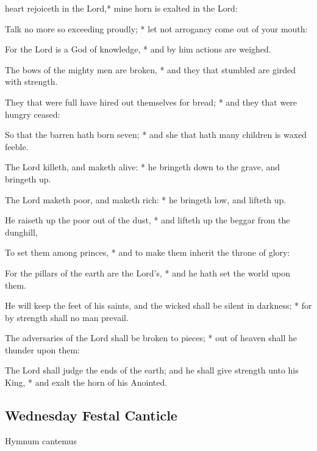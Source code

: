 \begin{multicols}{2}
 heart rejoiceth in the Lord,* mine horn is exalted in the Lord:\par
{}
Talk no more so exceeding proudly; * let not arrogancy come out of your mouth:\par
For the Lord is a God of knowledge, * and by him actions are weighed.\par
The bows of the mighty men are broken, * and they that stumbled are girded with strength.\par
They that were full have hired out themselves for bread; * and they that were hungry ceased:\par
So that the barren hath born seven; * and she that hath many children is waxed feeble.\par
The Lord killeth, and maketh alive: * he bringeth down to the grave, and bringeth up.\par
The Lord maketh poor, and maketh rich: * he bringeth low, and lifteth up.\par
He raiseth up the poor out of the dust, * and lifteth up the beggar from the dunghill,\par
To set them among princes, * and to make them inherit the throne of glory:\par
For the pillars of the earth are the Lord's, * and he hath set the world upon them.\par
He will keep the feet of his saints, {\dag} and the wicked shall be silent in darkness; * for by strength shall no man prevail.\par
The adversaries of the Lord shall be broken to pieces; * out of heaven shall he thunder upon them:\par
The Lord shall judge the ends of the earth; {\dag} and he shall give strength unto his King, * and exalt the horn of his Anointed.

\subsection{Wednesday Festal Canticle}

\begin{inhead}
Hymnum cantemus
\end{inhead}


\end{multicols}
